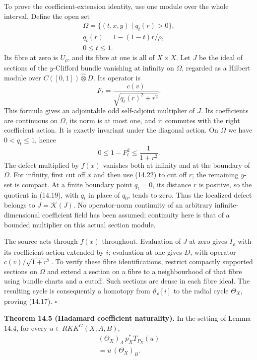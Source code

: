 \documentclass[
  11pt,
]{article}
\begin{document}
To prove the coefficient-extension identity, use one module over the
whole interval. Define the open set \[
\begin{gathered}
\Omega=\{(t,x,y)\mid q_t(r)>0\},\\
q_t(r)=1-(1-t)r/\rho,\\
0\leq t\leq1.
\end{gathered}
\tag{14.20}
\] Its fibre at zero is \(U_\rho\), and its fibre at one is all of
\(X\times X\). Let \(J\) be the ideal of sections of the \(y\)-Clifford
bundle vanishing at infinity on \(\Omega\), regarded as a Hilbert module
over \(C([0,1])\widehat\otimes D\). Its operator is \[
F_t=\frac{c(v)}{\sqrt{q_t(r)^2+r^2}}.
\tag{14.21}
\] This formula gives an adjointable odd self-adjoint multiplier of
\(J\). Its coefficients are continuous on \(\Omega\), its norm is at
most one, and it commutes with the right coefficient action. It is
exactly invariant under the diagonal action. On \(\Omega\) we have
\(0<q_t\leq1\), hence \[
0\leq1-F_t^2
\leq\frac1{1+r^2}.
\tag{14.22}
\] The defect multiplied by \(f(x)\) vanishes both at infinity and at
the boundary of \(\Omega\). For infinity, first cut off \(x\) and then
use (14.22) to cut off \(r\); the remaining \(y\)-set is compact. At a
finite boundary point \(q_t=0\), its distance \(r\) is positive, so the
quotient in (14.19), with \(q_t\) in place of \(q_0\), tends to zero.
Thus the localized defect belongs to \(J=\mathcal K(J)\). No
operator-norm continuity of an arbitrary infinite-dimensional
coefficient field has been assumed; continuity here is that of a bounded
multiplier on this actual section module.

The source acts through \(f(x)\) throughout. Evaluation of \(J\) at zero
gives \(I_\rho\) with its coefficient action extended by \(i\);
evaluation at one gives \(D\), with operator \(c(v)/\sqrt{1+r^2}\). To
verify these fibre identifications, restrict compactly supported
sections on \(\Omega\) and extend a section on a fibre to a
neighbourhood of that fibre using bundle charts and a cutoff. Such
sections are dense in each fibre ideal. The resulting cycle is
consequently a homotopy from \(\vartheta_\rho[i]\) to the radial cycle
\(\Theta_X\), proving (14.17). \(\square\)

\textbf{Theorem 14.5 (Hadamard coefficient naturality).} In the setting
of Lemma 14.4, for every \(u\in RKK^G(X;A,B)\), \[
\begin{gathered}
(\Theta_X)_A\,p_X^*T_{P_X}(u)\\
=u\,(\Theta_X)_B.
\end{gathered}
\tag{14.23}
\]
\end{document}

